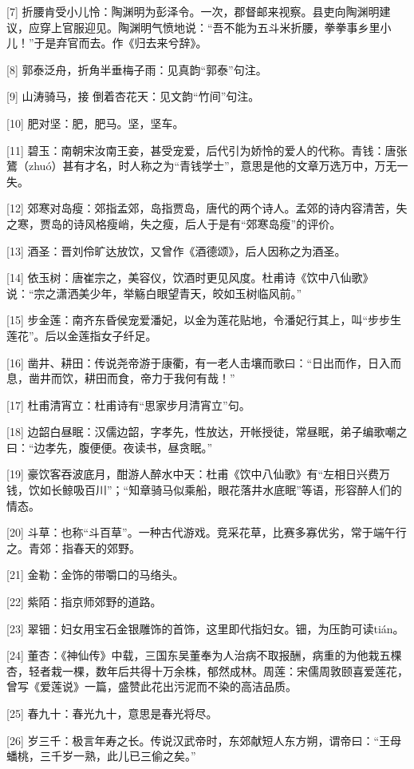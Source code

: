 \documentclass[12pt,UTF8]{ctexbook}
\begin{document}
[7] 折腰肯受小儿怜：陶渊明为彭泽令。一次，郡督邮来视察。县吏向陶渊明建议，应穿上官服迎见。陶渊明气愤地说：“吾不能为五斗米折腰，拳拳事乡里小儿！”于是弃官而去。作《归去来兮辞》。

[8] 郭泰泛舟，折角半垂梅子雨：见真韵“郭泰”句注。

[9] 山涛骑马，接 倒着杏花天：见文韵“竹间”句注。

[10] 肥对坚：肥，肥马。坚，坚车。

[11] 碧玉：南朝宋汝南王妾，甚受宠爱，后代引为娇怜的爱人的代称。青钱：唐张鷟（zhuó）甚有才名，时人称之为“青钱学士”，意思是他的文章万选万中，万无一失。

[12] 郊寒对岛瘦：郊指孟郊，岛指贾岛，唐代的两个诗人。孟郊的诗内容清苦，失之寒，贾岛的诗风格瘦峭，失之瘦，后人于是有“郊寒岛瘦”的评价。

[13] 酒圣：晋刘伶旷达放饮，又曾作《酒德颂》，后人因称之为酒圣。

[14] 依玉树：唐崔宗之，美容仪，饮酒时更见风度。杜甫诗《饮中八仙歌》说：“宗之潇洒美少年，举觞白眼望青天，皎如玉树临风前。”

[15] 步金莲：南齐东昏侯宠爱潘妃，以金为莲花贴地，令潘妃行其上，叫“步步生莲花”。后以金莲指女子纤足。

[16] 凿井、耕田：传说尧帝游于康衢，有一老人击壤而歌曰：“日出而作，日入而息，凿井而饮，耕田而食，帝力于我何有哉！”

[17] 杜甫清宵立：杜甫诗有“思家步月清宵立”句。

[18] 边韶白昼眠：汉儒边韶，字孝先，性放达，开帐授徒，常昼眠，弟子编歌嘲之曰：“边孝先，腹便便。夜读书，昼贪眠。”

[19] 豪饮客吞波底月，酣游人醉水中天：杜甫《饮中八仙歌》有“左相日兴费万钱，饮如长鲸吸百川”；“知章骑马似乘船，眼花落井水底眠”等语，形容醉人们的情态。

[20] 斗草：也称“斗百草”。一种古代游戏。竞采花草，比赛多寡优劣，常于端午行之。青郊：指春天的郊野。

[21] 金勒：金饰的带嚼口的马络头。

[22] 紫陌：指京师郊野的道路。

[23] 翠钿：妇女用宝石金银雕饰的首饰，这里即代指妇女。钿，为压韵可读tián。

[24] 董杏：《神仙传》中载，三国东吴董奉为人治病不取报酬，病重的为他栽五棵杏，轻者栽一棵，数年后共得十万余株，郁然成林。周莲：宋儒周敦颐喜爱莲花，曾写《爱莲说》一篇，盛赞此花出污泥而不染的高洁品质。

[25] 春九十：春光九十，意思是春光将尽。

[26] 岁三千：极言年寿之长。传说汉武帝时，东郊献短人东方朔，谓帝曰：“王母蟠桃，三千岁一熟，此儿已三偷之矣。”
\end{document}
